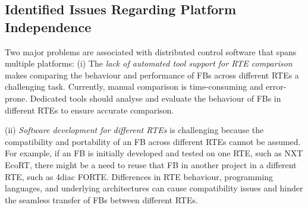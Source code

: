\subsection{Identified Issues Regarding Platform Independence}
Two major problems are associated with distributed control software that spans multiple platforms: 
(i) The \emph{lack of automated tool support for RTE comparison} makes comparing the behaviour and performance of FBs across different RTEs a challenging task. Currently, manual comparison is time-consuming and error-prone. Dedicated tools should analyse and evaluate the behaviour of FBs in different RTEs to ensure accurate comparison.

(ii) \emph{Software development for different RTEs} is challenging because the compatibility and portability of an FB across different RTEs cannot be assumed. 
For example, if an FB is initially developed and tested on one RTE, such as NXT EcoRT, there might be a need to reuse that FB in another project in a different RTE, such as 4diac FORTE. Differences in RTE behaviour, programming languages, and underlying architectures can cause compatibility issues and hinder the seamless transfer of FBs between different RTEs. 